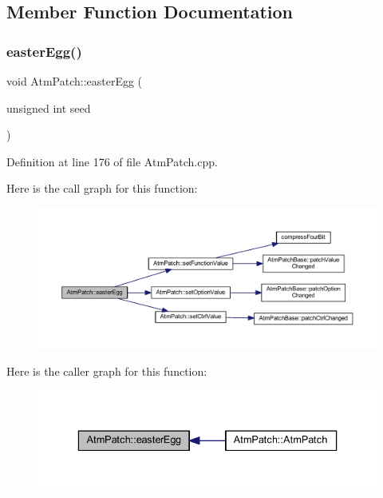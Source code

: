 \subsection{Member Function Documentation}
\mbox{\label{class_atm_patch_ad7a325c544381189f9419131feba685b}} 
\subsubsection{\texorpdfstring{easter\+Egg()}{easterEgg()}}
{\footnotesize\ttfamily void Atm\+Patch\+::easter\+Egg (\begin{DoxyParamCaption}\item[{unsigned int}]{seed }\end{DoxyParamCaption})}



Definition at line 176 of file Atm\+Patch.\+cpp.

Here is the call graph for this function\+:
\nopagebreak
\begin{figure}[H]
\begin{center}
\leavevmode
\includegraphics[width=350pt]{class_atm_patch_ad7a325c544381189f9419131feba685b_cgraph}
\end{center}
\end{figure}
Here is the caller graph for this function\+:
\nopagebreak
\begin{figure}[H]
\begin{center}
\leavevmode
\includegraphics[width=336pt]{class_atm_patch_ad7a325c544381189f9419131feba685b_icgraph}
\end{center}
\end{figure}
\mbox{\label{class_atm_patch_a5e8835fb80bdd1f130f129edde447d35}} 
